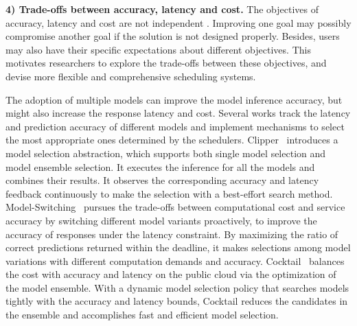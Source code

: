 \textbf{4) Trade-offs between accuracy, latency and cost.}
The objectives of accuracy, latency and cost are not independent {\tiny{}}. Improving one goal may possibly compromise another goal if the solution is not designed properly. Besides, users may also have their specific expectations about different objectives. This motivates researchers to explore the trade-offs between these objectives, and devise more flexible and comprehensive scheduling systems.


The adoption of multiple models can improve the model inference accuracy, but might also increase the response latency and cost. Several works track the latency and prediction accuracy of different models and implement mechanisms to select the most appropriate ones determined by the schedulers.
Clipper~\cite{Daniel2017clipper} introduces a model selection abstraction, which supports both single model selection and model ensemble selection. It executes the inference for all the models and combines their results. It observes the corresponding accuracy and latency feedback continuously to make the selection with a best-effort search method. Model-Switching~\cite{jeff2020modelswitching} pursues the trade-offs between computational cost and service accuracy by switching different model variants proactively, to improve the accuracy of responses under the latency constraint. By maximizing the ratio of correct predictions returned within the deadline, it makes selections among model variations with different computation demands and accuracy.  Cocktail~\cite{Jashwant2021Cocktail} balances the cost with accuracy and latency on the public cloud via the optimization of the model ensemble. With a dynamic model selection policy that searches models tightly with the accuracy and latency bounds, Cocktail reduces the candidates in the ensemble and accomplishes fast and efficient model selection.







